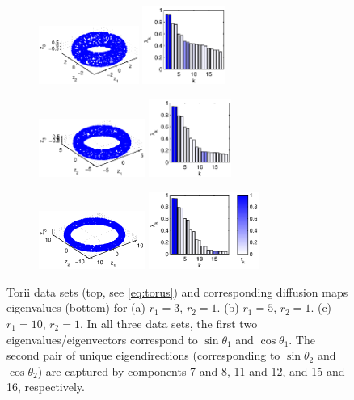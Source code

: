 \begin{figure}[t]
\centering
\begin{subfigure}{1.5in}
\centering
\includegraphics[height=0.75in]{torus1}
\includegraphics[height=1in]{torus1_evals}
\caption{}
\end{subfigure}
%
%
\begin{subfigure}{1.5in}
\centering
\includegraphics[height=0.75in]{torus2}
\includegraphics[height=1in]{torus2_evals}
\caption{}
\end{subfigure}
%
%
\begin{subfigure}{1.5in}
\centering
\includegraphics[height=0.75in]{torus3}
\includegraphics[height=1in]{torus3_evals}
\caption{}
\end{subfigure}
%
\hfill
%
\caption[Eigenvalues and eigenvectors of diffusion maps on a torus]{Torii data sets (top, see \eqref{eq:torus}) and corresponding diffusion maps eigenvalues (bottom) for (a) $r_1 = 3$, $r_2 = 1$. (b) $r_1 = 5$, $r_2 = 1$. (c) $r_1 = 10$, $r_2 = 1$. In all three data sets, the first two eigenvalues/eigenvectors correspond to $\sin \theta_1$ and $\cos \theta_1$. The second pair of unique eigendirections (corresponding to $\sin \theta_2$ and $\cos \theta_2$) are captured by components 7 and 8, 11 and 12, and 15 and 16, respectively.}
%
\label{fig:torus}
%
\end{figure}

